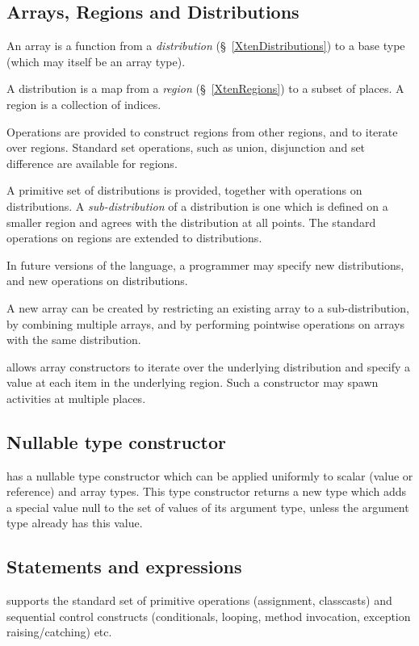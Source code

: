 \subsection{Arrays, Regions and Distributions}
An \Xten{} array is a function from a {\em distribution}
(\S~\ref{XtenDistributions}) to a base type (which may itself be an
array type).

A distribution is a map from a {\em region} (\S~\ref{XtenRegions}) to a
subset of places.  A region is a collection of indices.

Operations are provided to construct regions from other regions, and
to iterate over regions. Standard set operations, such as union,
disjunction and set difference are available for regions.

A primitive set of distributions is provided, together with operations
on distributions. A {\em sub-distribution} of a distribution is one
which is defined on a smaller region and agrees with the distribution
at all points.  The standard operations on regions are extended to
distributions.

In future versions of the language, a programmer may specify new
distributions, and new operations on distributions.

A new array can be created by restricting an existing array to a
sub-distribution, by combining multiple arrays, and by performing
pointwise operations on arrays with the same distribution.

\Xten{} allows array constructors to iterate over the underlying
distribution and specify a value at each item in the underlying
region. Such a constructor may spawn activities at multiple places.


\subsection{Nullable type constructor}

\Xten{} has a {\cf nullable} type constructor which can be applied uniformly to
scalar (value or reference) and array types. This type constructor
returns a new type which adds a special value {\cf null} to the set of
values of its argument type, unless the argument type already has this
value.

\subsection{Statements and expressions}
\Xten{} supports the standard set of primitive operations (assignment, classcasts) and sequential control constructs (conditionals, looping, method
invocation, exception raising/catching) etc.

